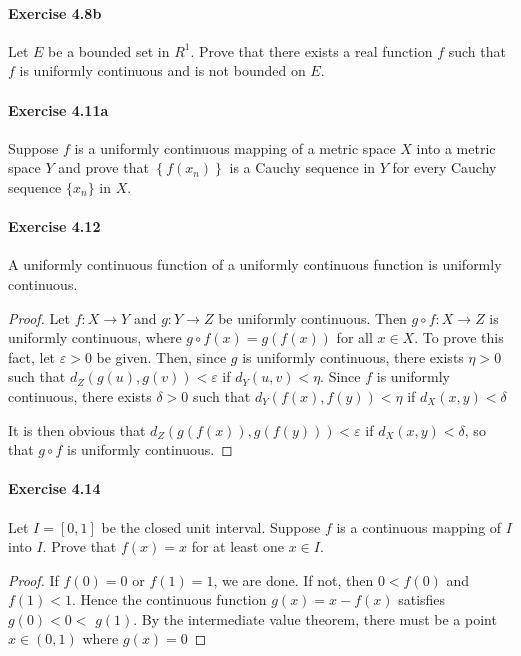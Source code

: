 \documentclass{article}
\theoremstyle{definition}
\begin{document}
\paragraph{Exercise 4.8b} Let $E$ be a bounded set in $R^{1}$. Prove that there exists a real function $f$ such that $f$ is uniformly continuous and is not bounded on $E$.

\paragraph{Exercise 4.11a} Suppose $f$ is a uniformly continuous mapping of a metric space $X$ into a metric space $Y$ and prove that $\left\{f\left(x_{n}\right)\right\}$ is a Cauchy sequence in $Y$ for every Cauchy sequence $\{x_n\}$ in $X$.

\paragraph{Exercise 4.12} A uniformly continuous function of a uniformly continuous function is uniformly continuous.
\begin{proof}
    Let $f: X \rightarrow Y$ and $g: Y \rightarrow Z$ be uniformly continuous. Then $g \circ f: X \rightarrow Z$ is uniformly continuous, where $g \circ f(x)=g(f(x))$ for all $x \in X$.
To prove this fact, let $\varepsilon>0$ be given. Then, since $g$ is uniformly continuous, there exists $\eta>0$ such that $d_Z(g(u), g(v))<\varepsilon$ if $d_Y(u, v)<\eta$. Since $f$ is uniformly continuous, there exists $\delta>0$ such that $d_Y(f(x), f(y))<\eta$ if $d_X(x, y)<\delta$

It is then obvious that $d_Z(g(f(x)), g(f(y)))<\varepsilon$ if $d_X(x, y)<\delta$, so that $g \circ f$ is uniformly continuous.
\end{proof}


\paragraph{Exercise 4.14} Let $I=[0,1]$ be the closed unit interval. Suppose $f$ is a continuous mapping of $I$ into $I$. Prove that $f(x)=x$ for at least one $x \in I$.
\begin{proof}
    If $f(0)=0$ or $f(1)=1$, we are done. If not, then $0<f(0)$ and $f(1)<1$. Hence the continuous function $g(x)=x-f(x)$ satisfies $g(0)<0<$ $g(1)$. By the intermediate value theorem, there must be a point $x \in(0,1)$ where $g(x)=0$
\end{proof}
\end{document}
